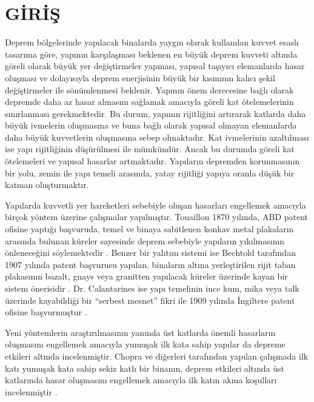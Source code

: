 
\chapter{GİRİŞ}

\label{CH1}

Deprem bölgelerinde yapılacak binalarda yaygın olarak kullanılan kuvvet
esaslı tasarıma göre, yapının karşılaşması beklenen en büyük deprem
kuvveti altında göreli olarak büyük yer değiştirmeler yapması, yapısal
taşıyıcı elemanlarda hasar oluşması ve dolayısıyla deprem enerjisinin
büyük bir kısmının kalıcı şekil değiştirmeler ile sönümlenmesi beklenir.
Yapının önem derecesine bağlı olarak depremde daha az hasar almasını
sağlamak amacıyla göreli kat ötelemelerinin sınırlanması gerekmektedir.
Bu durum, yapının rijitliğini artırarak katlarda daha büyük ivmelerin
oluşmasına ve buna bağlı olarak yapısal olmayan elemanlarda daha büyük
kuvvetlerin oluşmasına sebep olmaktadır. Kat ivmelerinin azaltılması
ise yapı rijitliğinin düşürülmesi ile mümkündür. Ancak bu durumda
göreli kat ötelemeleri ve yapısal hasarlar artmaktadır. Yapıların
depremden korunmasının bir yolu, zemin ile yapı temeli arasında, yatay
rijitliği yapıya oranla düşük bir katman oluşturmaktır.

Yapılarda kuvvetli yer hareketleri sebebiyle oluşan hasarları engellemek
amacıyla birçok yöntem üzerine çalışmalar yapılmıştır. Touaillon 1870
yılında, ABD patent ofisine yaptığı başvuruda, temel ve binaya sabitlenen
konkav metal plakaların arasında bulunan küreler sayesinde deprem
sebebiyle yapıların yıkılmasının önleneceğini söylemektedir \cite{Touaillon1870}.
Benzer bir yalıtım sistemi ise Bechtold tarafından 1907 yılında patent
başvurusu yapılan, binaların altına yerleştirilen rijit taban plakasının
bazalt, gnays veya granitten yapılacak küreler üzerinde kayan bir
sistem önerisidir \cite{Bechtold1907}. Dr. Calantarines ise yapı
temelinin ince kum, mika veya talk üzerinde kayabildiği bir ``serbest
mesnet'' fikri ile 1909 yılında İngiltere patent ofisine başvurmuştur
\cite{calantarients1909improvements}.

Yeni yöntemlerin araştırılmasının yanında üst katlarda önemli hasarların
oluşmasını engellemek amacıyla yumuşak ilk kata sahip yapılar da depreme
etkileri altında incelenmiştir. Chopra ve diğerleri tarafından yapılan
çalışmada ilk katı yumuşak kata sahip sekiz katlı bir binanın, deprem
etkileri altında üst katlarında hasar oluşmasını engellemek amacıyla
ilk katın akma koşulları incelenmiştir \cite{doi:10.1002/eqe.4290010405}.

